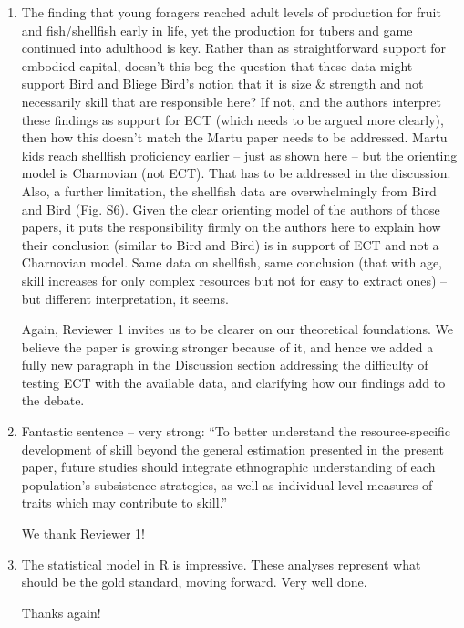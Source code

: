 \documentclass{article}
\newcommand{\rev}[1]{{\color{ForestGreen}#1}}
\begin{document}
\begin{enumerate}
    \item The finding that young foragers reached adult levels of production for fruit and fish/shellfish early in life, yet the production for tubers and game continued into adulthood is key. Rather than as straightforward support for embodied capital, doesn’t this beg the question that these data might support Bird and Bliege Bird’s notion that it is size \& strength and not necessarily skill that are responsible here? If not, and the authors interpret these findings as support for ECT (which needs to be argued more clearly), then how this doesn’t match the Martu paper needs to be addressed. Martu kids reach shellfish proficiency earlier – just as shown here – but the orienting model is Charnovian (not ECT). That has to be addressed in the discussion. Also, a further limitation, the shellfish data are overwhelmingly from Bird and Bird (Fig. S6). Given the clear orienting model of the authors of those papers, it puts the responsibility firmly on the authors here to explain how their conclusion (similar to Bird and Bird) is in support of ECT and not a Charnovian model. Same data on shellfish, same conclusion (that with age, skill increases for only complex resources but not for easy to extract ones) – but different interpretation, it seems. 
    
\rev{Again, Reviewer 1 invites us to be clearer on our theoretical foundations. We believe the paper is growing stronger because of it, and hence we added a fully new paragraph in the Discussion section addressing the difficulty of testing ECT with the available data, and clarifying how our findings add to the debate.}

    \item Fantastic sentence – very strong: “To better understand the resource-specific development of skill beyond the general estimation presented in the present paper, future studies should integrate ethnographic understanding of each population’s subsistence strategies, as well as individual-level measures of traits which may contribute to skill.”
    
\rev{We thank Reviewer 1!}
    
    \item The statistical model in R is impressive. These analyses represent what should be the gold standard, moving forward. Very well done.

\rev{Thanks again!}

\end{enumerate}
\end{document}
